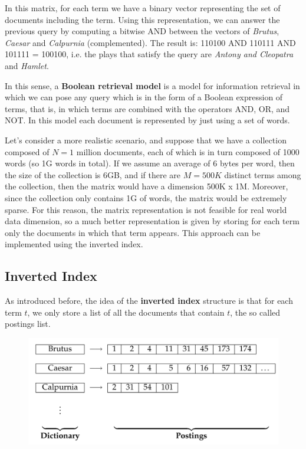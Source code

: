 In this matrix, for each term we have a binary vector representing the set of documents including the term. Using this representation, we can answer the previous query by computing a bitwise AND between the vectors of \textit{Brutus}, \textit{Caesar} and \textit{Calpurnia} (complemented). The result is: 110100 AND 110111 AND 101111 = 100100, i.e. the plays that satisfy the query are \textit{Antony and Cleopatra} and \textit{Hamlet}.

In this sense, a \textbf{Boolean retrieval model} is a model for information retrieval in which we can pose any query which is in the form of a Boolean expression of terms, that is, in which terms are combined with the operators AND, OR, and NOT. In this model each document is represented by just using a set of words.

Let's consider a more realistic scenario, and suppose that we have a collection composed of $N = 1$ million documents, each of which is in turn composed of 1000 words (so 1G words in total). If we assume an average of 6 bytes per word, then the size of the collection is 6GB, and if there are $M = 500K$ distinct terms among the collection, then the matrix would have a dimension 500K x 1M. Moreover, since the collection only contains 1G of words, the matrix would be extremely sparse. For this reason, the matrix representation is not feasible for real world data dimension, so a much better representation is given by storing for each term only the documents in which that term appears. This approach can be implemented using the inverted index.

\subsection{Inverted Index}
As introduced before, the idea of the \textbf{inverted index} structure is that for each term $t$, we only store a list of all the documents that contain $t$, the so called postings list. 

\begin{figure}[h!]
		\centering
		\includegraphics[scale = 0.6]{img/inverted index.jpg}
		\label{inc_mat}
\end{figure}

